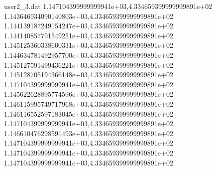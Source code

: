 \begin{filecontents}{user2_3.dat}
1.147104399999999941e+03,4.334659399999999891e+02
1.143646934090140803e+03,4.334659399999999891e+02
1.144139187249154247e+03,4.334659399999999891e+02
1.144140857791549251e+03,4.334659399999999891e+02
1.145125360338600331e+03,4.334659399999999891e+02
1.144634781492957700e+03,4.334659399999999891e+02
1.145127591499436221e+03,4.334659399999999891e+02
1.145128705194366148e+03,4.334659399999999891e+02
1.147104399999999941e+03,4.334659399999999891e+02
1.145622628895774596e+03,4.334659399999999891e+02
1.146115995749717968e+03,4.334659399999999891e+02
1.146116552597183045e+03,4.334659399999999891e+02
1.147104399999999941e+03,4.334659399999999891e+02
1.146610476298591493e+03,4.334659399999999891e+02
1.147104399999999941e+03,4.334659399999999891e+02
1.147104399999999941e+03,4.334659399999999891e+02
1.147104399999999941e+03,4.334659399999999891e+02
\end{filecontents}